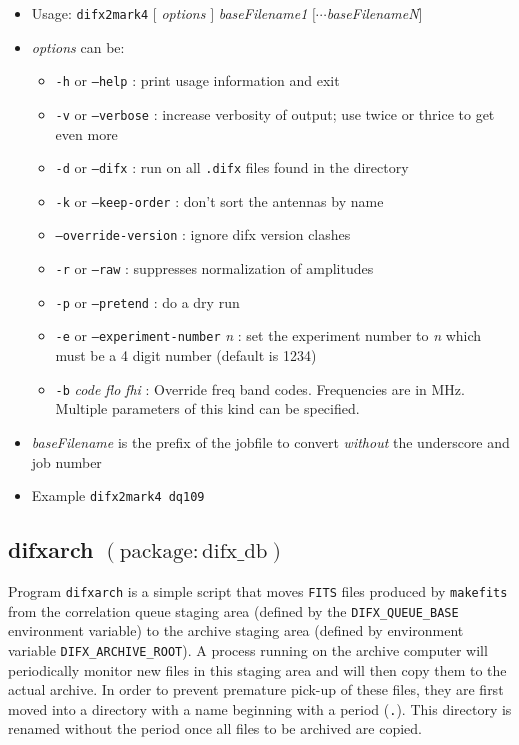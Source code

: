 \begin{itemize}
\item[] Usage: {\tt difx2mark4} $[$ {\em options} $]$ {\em baseFilename1} $[\cdots${\em baseFilenameN}$]$
\item[] {\em options} can be:
\begin{itemize}
\item[] {\tt -h} or {\tt --help} : print usage information and exit
\item[] {\tt -v} or {\tt --verbose} : increase verbosity of output; use twice or thrice to get even more
\item[] {\tt -d} or {\tt --difx} : run on all {\tt .difx} files found in the directory
\item[] {\tt -k} or {\tt --keep-order} : don't sort the antennas by name
\item[] {\tt --override-version} : ignore difx version clashes
\item[] {\tt -r} or {\tt --raw} : suppresses normalization of amplitudes
\item[] {\tt -p} or {\tt --pretend} : do a dry run
\item[] {\tt -e} or {\tt --experiment-number} {\em n} : set the experiment number to {\em n} which must be a 4 digit number (default is 1234)
\item[] {\tt -b} {\em code} {\em flo} {\em fhi} : Override freq band codes.  Frequencies are in MHz.  Multiple parameters of this kind can be specified.
\end{itemize}
\item[] {\em baseFilename} is the prefix of the jobfile to convert {\em without} the underscore and job number
\item[] Example {\tt difx2mark4 dq109}
\end{itemize}







\subsection{difxarch {\small $\mathrm{(package: difx\_db)}$}} \label{sec:difxarch}

Program {\tt difxarch} is a simple script that moves {\tt FITS} files produced by {\tt makefits} from the correlation queue staging area (defined by the {\tt DIFX\_QUEUE\_BASE} environment variable) to the archive staging area (defined by environment variable {\tt DIFX\_ARCHIVE\_ROOT}).
A process running on the archive computer will periodically monitor new files in this staging area and will then copy them to the actual archive.
In order to prevent premature pick-up of these files, they are first moved into a directory with a name beginning with a period ({\tt .}).
This directory is renamed without the period once all files to be archived are copied.

